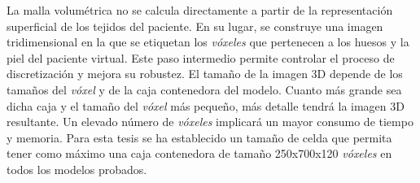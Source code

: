 La malla volumétrica no se calcula directamente a partir de la representación superficial de los tejidos del paciente. En su lugar, se construye una imagen tridimensional en la que se etiquetan los \emph{vóxeles} que pertenecen a los huesos y la piel del paciente virtual. Este paso intermedio permite controlar el proceso de discretización y mejora su robustez.
El tamaño de la imagen 3D depende de los tamaños del \emph{vóxel} y de la caja contenedora del modelo. Cuanto más grande sea dicha caja y el tamaño del \emph{vóxel} más pequeño, más detalle tendrá la imagen 3D resultante. Un elevado número de \emph{vóxeles} implicará un mayor consumo de tiempo y memoria.
Para esta tesis se ha establecido un tamaño de celda que permita tener como máximo una caja contenedora de tamaño 250x700x120 \emph{vóxeles} en todos los modelos probados.

